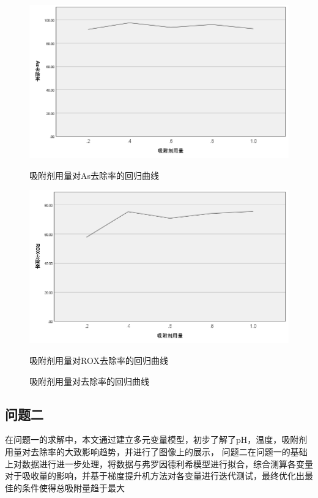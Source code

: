 \documentclass[AutoFakeBold]{ctexart}
\begin{document}
	\begin{figure}[H]
		\centering
		\begin{minipage}{0.45\textwidth}
			\centering
			\includegraphics[width=\linewidth]{numAs.png}
			\caption*{吸附剂用量对As去除率的回归曲线}
			\label{fig:image1}
		\end{minipage}
		\hfill
		\begin{minipage}{0.45\textwidth}
			\centering
			\includegraphics[width=\linewidth]{numROX.png}
			\caption*{吸附剂用量对ROX去除率的回归曲线}
			\label{fig:image2}
		\end{minipage}
		\caption{吸附剂用量对去除率的回归曲线}
	\end{figure}
	
	

	

	
	\subsection{问题二}
	
	\songti{}在问题一的求解中，本文通过建立多元变量模型，初步了解了pH，温度，吸附剂用量对去除率的大致影响趋势，并进行了图像上的展示，
	\songti{}问题二在问题一的基础上对数据进行进一步处理，将数据与弗罗因德利希模型进行拟合，综合测算各变量对于吸收量的影响，并基于梯度提升机方法对各变量进行迭代测试，最终优化出最佳的条件使得总吸附量趋于最大
\end{document}
